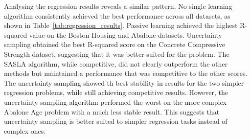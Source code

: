 \documentclass[conference]{IEEEtran}
\begin{document}
	\begin{table}[htbp]
		\centering
		\caption{Classification results for each learning strategy}
		\label{tab:classification_results}
	\end{table}
	
	Analysing the regression results reveals a similar pattern. No single learning algorithm consistently achieved the best performance across all datasets, as shown in Table~\ref{tab:regression_results}. Passive learning achieved the highest R-squared value on the Boston Housing and Abalone datasets. Uncertainty sampling obtained the best R-squared score on the Concrete Compressive Strength dataset, suggesting that it was better suited for the problem. The SASLA algorithm, while competitive, did not clearly outperform the other methods but maintained a performance that was competitive to the other scores. The uncertainty sampling showed th best stability in results for the two simpler regression problems, while still achieving competitive results. However, the uncertainty sampling algorithm performed the worst on the more complex Abalone Age problem with a much less stable result. This suggests that uncertainty sampling is better suited to simpler regression tasks instead of complex ones. 
	
\end{document}

